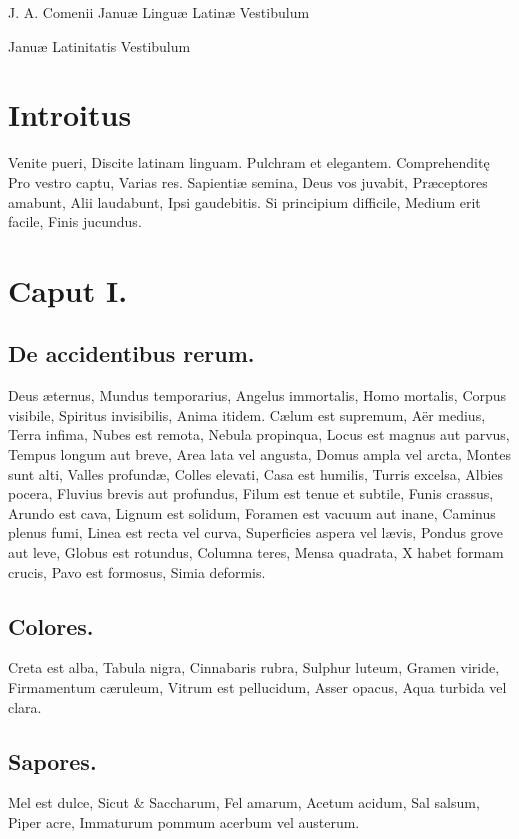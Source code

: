 \documentclass{book}
\begin{document}
J. A. Comenii
Januæ 
Linguæ Latinæ
Vestibulum

Januæ Latinitatis 
Vestibulum

\chapter{Introitus}
Venite pueri,
Discite latinam linguam.
Pulchram et elegantem.
Comprehenditę
Pro vestro captu,
Varias res.
Sapientiæ semina,
Deus vos juvabit,
Præceptores amabunt,
Alii laudabunt,
Ipsi gaudebitis.
Si principium difficile,
Medium erit facile,
Finis jucundus.

\chapter{Caput I.}

\section{De accidentibus rerum.}

Deus æternus,
Mundus temporarius,
Angelus immortalis,
Homo mortalis,
Corpus visibile,
Spiritus invisibilis,
Anima itidem.
Cælum est supremum,
Aër medius,
Terra infima,
Nubes est remota,
Nebula propinqua,
Locus est magnus aut parvus,
Tempus longum aut breve,
Area lata vel angusta,
Domus ampla vel arcta,
Montes sunt alti,
Valles profundæ,
Colles elevati,
Casa est humilis,
Turris excelsa,
Albies pocera,
Fluvius brevis aut profundus,
Filum est tenue et subtile,
Funis crassus,
Arundo est cava,
Lignum est solidum,
Foramen est vacuum aut inane,
Caminus plenus fumi,
Linea est recta vel curva,
Superficies aspera vel lævis,
Pondus grove aut leve,
Globus est rotundus,
Columna teres,
Mensa quadrata,
X habet formam crucis,
Pavo est formosus,
Simia deformis.

\section{Colores.}

Creta est alba,
Tabula nigra,
Cinnabaris rubra,
Sulphur luteum,
Gramen viride,
Firmamentum cæruleum,
Vitrum est pellucidum,
Asser opacus,
Aqua turbida vel clara.

\section{Sapores.}

Mel est dulce,
Sicut & Saccharum,
Fel amarum,
Acetum acidum,
Sal salsum,
Piper acre,
Immaturum pommum acerbum vel austerum.
\end{document}
